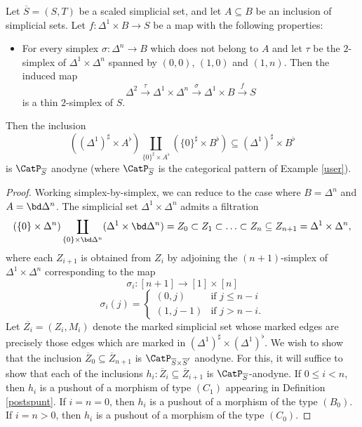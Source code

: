 \begin{lemma}\label{carp}
Let $\overline{S} = (S,T)$ be a scaled simplicial set, and let $A \subseteq B$ be an inclusion of simplicial sets. Let $f: \Delta^1 \times B \rightarrow S$ be a map with the following
properties:
\begin{itemize}
\item For every simplex $\sigma: \Delta^n \rightarrow B$ which does not belong to $A$
and let $\tau$ be the $2$-simplex of $\Delta^1 \times \Delta^n$ spanned by
$(0,0)$, $(1,0)$ and $(1,n)$. Then the induced map
$$ \Delta^2 \stackrel{\tau}{\rightarrow} \Delta^1 \times \Delta^n
\stackrel{\sigma}{\rightarrow} \Delta^1 \times B \stackrel{f}{\rightarrow} S$$
is a thin $2$-simplex of $S$.
\end{itemize}
Then the inclusion 
$$((\Delta^1)^{\sharp} \times A^{\flat}) \coprod_{ \{0\}^{\sharp} \times A^{\flat} }
(\{0\}^{\sharp} \times B^{\flat}) \subseteq (\Delta^1)^{\sharp} \times B^{\flat}$$
is $\CatP_{\overline{S}}$ anodyne (where $\CatP_{\overline{S}}$ is the categorical
pattern of Example \ref{user}).
\end{lemma}

\begin{proof}
Working simplex-by-simplex, we can reduce to the case where
$B = \Delta^n$ and $A = \bd \Delta^n$. The simplicial
set $\Delta^1 \times \Delta^n$ admits a filtration
$$ (\{0\} \times \Delta^n) \coprod_{ \{0\} \times \bd \Delta^n} ( \Delta^1 \times \bd \Delta^n)
= Z_0 \subset Z_1 \subset \ldots \subset Z_{n} \subseteq Z_{n+1} = \Delta^1 \times \Delta^n,$$
where each $Z_{i+1}$ is obtained from $Z_{i}$ by adjoining the $(n+1)$-simplex of
$\Delta^1 \times \Delta^n$ corresponding to the map
$$ \sigma_i: [n+1] \rightarrow [1] \times [n]$$
$$ \sigma_i(j) = \begin{cases} (0,j) & \text{if } j \leq n-i \\
(1, j-1) & \text{if } j > n-i. \end{cases}$$
Let $\overline{Z_i} = (Z_i, M_i)$ denote the marked simplicial set whose marked edges
are precisely those edges which are marked in $(\Delta^1)^{\sharp} \times (\Delta^1)^{\flat}$. We wish to show that the inclusion
$\overline{Z}_0 \subseteq \overline{Z}_{n+1}$ is $\CatP_{\overline{S} \times \overline{S}'}$ anodyne. For this, it will suffice to show that each of the inclusions $h_i: \overline{Z}_i \subseteq \overline{Z}_{i+1}$ is $\CatP_{\overline{S}}$-anodyne. If $0 \leq i < n$, then
$h_i$ is a pushout of a morphism of type $(C_1)$ appearing in Definition \ref{postspunt}. If $i = n=0$, then $h_i$ is a pushout of a morphism of the type $(B_0)$. 
If $i=n>0$, then $h_i$ is a pushout of a morphism of the type $(C_0)$. 
\end{proof}

